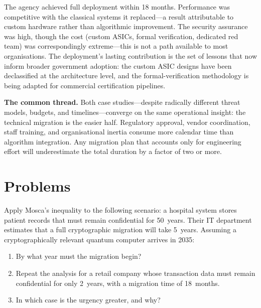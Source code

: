 The agency achieved full deployment within 18 months.  Performance was competitive with the classical systems it replaced---a result attributable to custom hardware rather than algorithmic improvement.  The security assurance was high, though the cost (custom ASICs, formal verification, dedicated red team) was correspondingly extreme---this is not a path available to most organisations.  The deployment's lasting contribution is the set of lessons that now inform broader government adoption: the custom ASIC designs have been declassified at the architecture level, and the formal-verification methodology is being adapted for commercial certification pipelines.

\begin{svgraybox}
\textbf{The common thread.}  Both case studies---despite radically different threat models, budgets, and timelines---converge on the same operational insight: the technical migration is the easier half.  Regulatory approval, vendor coordination, staff training, and organisational inertia consume more calendar time than algorithm integration.  Any migration plan that accounts only for engineering effort will underestimate the total duration by a factor of two or more.
\end{svgraybox}


\section*{Problems}

\begin{prob}
\label{prob:ch13-mosca}
Apply Mosca's inequality to the following scenario: a hospital system stores patient records that must remain confidential for 50~years.  Their IT department estimates that a full cryptographic migration will take 5~years.  Assuming a cryptographically relevant quantum computer arrives in 2035:
\begin{enumerate}
\item[(a)] By what year must the migration begin?
\item[(b)] Repeat the analysis for a retail company whose transaction data must remain confidential for only 2~years, with a migration time of 18~months.
\item[(c)] In which case is the urgency greater, and why?
\end{enumerate}
\end{prob}

